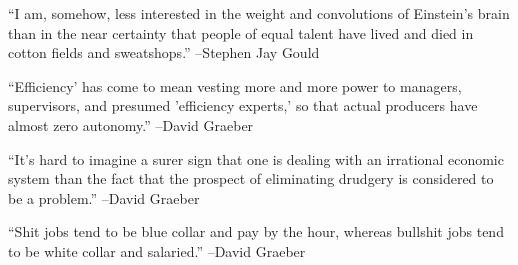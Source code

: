 \documentclass{article}%
\begin{document}
\linebreak%
\vspace{1mm}%
\begin{minipage}{\textwidth}%
\flushleft%
“I am, somehow, less interested in the weight and convolutions of Einstein's brain than in the near certainty that people of equal talent have lived and died in cotton fields and sweatshops.”%
\linebreak%
\vspace{1mm}%
–Stephen Jay Gould%
\linebreak%
\vspace{1mm}%
\end{minipage}%
\linebreak%
\vspace{1mm}%
\begin{minipage}{\textwidth}%
\flushleft%
“Efficiency' has come to mean vesting more and more power to managers, supervisors, and presumed 'efficiency experts,' so that actual producers have almost zero autonomy.”%
\linebreak%
\vspace{1mm}%
–David Graeber%
\linebreak%
\vspace{1mm}%
\end{minipage}%
\linebreak%
\vspace{1mm}%
\begin{minipage}{\textwidth}%
\flushleft%
“It's hard to imagine a surer sign that one is dealing with an irrational economic system than the fact that the prospect of eliminating drudgery is considered to be a problem.”%
\linebreak%
\vspace{1mm}%
–David Graeber%
\linebreak%
\vspace{1mm}%
\end{minipage}%
\linebreak%
\vspace{1mm}%
\begin{minipage}{\textwidth}%
\flushleft%
“Shit jobs tend to be blue collar and pay by the hour, whereas bullshit jobs tend to be white collar and salaried.”%
\linebreak%
\vspace{1mm}%
–David Graeber%
\linebreak%
\vspace{1mm}%
\end{minipage}%
\linebreak%
\end{document}
